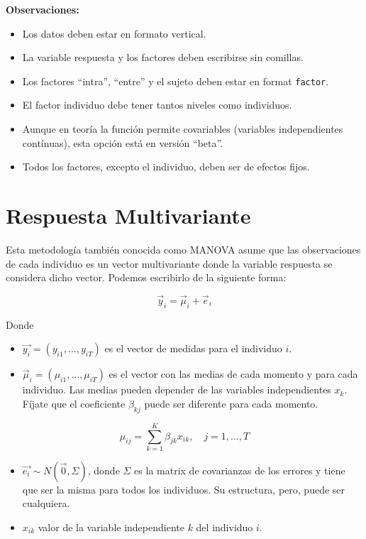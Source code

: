 \documentclass[
]{book}
\providecommand{\tightlist}{%
  \setlength{\itemsep}{0pt}\setlength{\parskip}{0pt}}
\begin{document}
\textbf{Observaciones:}

\begin{itemize}
\tightlist
\item
  Los datos deben estar en formato vertical.
\item
  La variable respuesta y los factores deben escribirse sin comillas.
\item
  Los factores ``intra'', ``entre'' y el sujeto deben estar en format \texttt{factor}.
\item
  El factor individuo debe tener tantos niveles como individuos.
\item
  Aunque en teoría la función permite covariables (variables independientes contínuas), esta opción está en versión ``beta''.
\item
  Todos los factores, excepto el individuo, deben ser de efectos fijos.
\end{itemize}

\hypertarget{respuesta-multivariante}{%
\section{Respuesta Multivariante}\label{respuesta-multivariante}}

Esta metodología también conocida como MANOVA asume que las observaciones de cada individuo es un vector multivariante donde la variable respuesta se considera dicho vector. Podemos escribirlo de la siguiente forma:

\[\vec{y}_i = \vec{\mu}_i + \vec{e}_i\]

Donde

\begin{itemize}
\item
  \(\vec{y_i}=(y_{i1},\ldots,y_{iT})\) es el vector de medidas para el individuo \(i\).
\item
  \(\vec{\mu}_i=(\mu_{i1},\ldots,\mu_{iT})\) es el vector con las medias de cada momento y para cada individuo. Las medias pueden depender de las variables independientes \(x_k\). Fíjate que el coeficiente \(\beta_{kj}\) puede ser diferente para cada momento.
\end{itemize}

\[\mu_{ij} = \sum_{k=1}^K \beta_{jk} x_{ik}, \quad j=1,...,T\]

\begin{itemize}
\item
  \(\vec{e_i} \sim N(\vec{0},\Sigma)\), donde \(\Sigma\) es la matrix de covarianzas de los errores y tiene que ser la misma para todos los individuos. Su estructura, pero, puede ser cualquiera.
\item
  \(x_{ik}\) valor de la variable independiente \(k\) del individuo \(i\).
\end{itemize}
\end{document}
